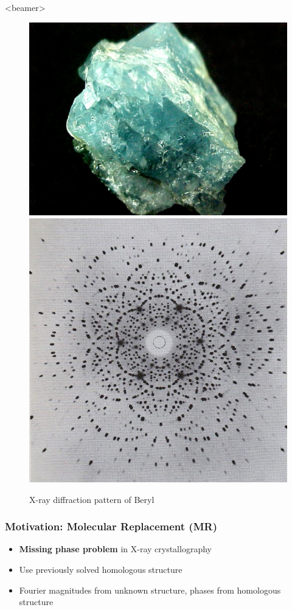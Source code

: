 \documentclass{beamer}
\begin{document}
\begin{frame}<beamer>
\begin{figure}
\centering
\includegraphics[width=.25 \columnwidth]{figures/beryl.jpg} \quad 
\includegraphics[scale=0.15]{figures/diffpattern.png}
\caption{X-ray diffraction pattern of Beryl}
\end{figure}
\frametitle{Motivation: Molecular Replacement (MR)}
\begin{itemize}
\item \textbf{Missing phase problem} in X-ray crystallography
\item Use previously solved homologous structure
\item Fourier magnitudes from unknown structure, phases from homologous structure
\end{itemize}
\end{frame}
\end{document}
